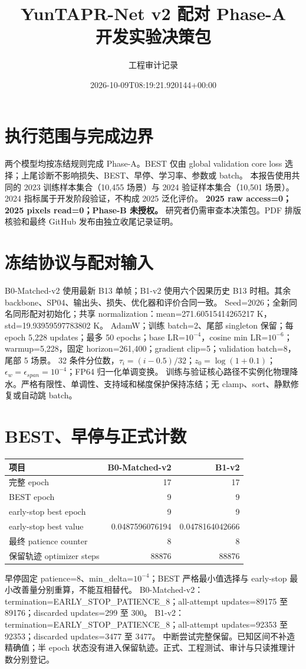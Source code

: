 \documentclass[UTF8,a4paper,11pt,fontset=windows]{ctexart}
\title{YunTAPR-Net v2 配对 Phase-A\\开发实验决策包}
\author{工程审计记录}\date{2026-10-09T08:19:21.920144+00:00}
\begin{document}
\maketitle
\section{执行范围与完成边界}
两个模型均按冻结规则完成 Phase-A。BEST 仅由 global validation core loss 选择；上尾诊断不影响损失、BEST、早停、学习率、参数或 batch。
本报告使用共同的 2023 训练样本集合（10,455 场景）与 2024 验证样本集合（10,501 场景）。2024 指标属于开发阶段验证，不构成 2025 泛化评价。
\textbf{2025 raw access=0；2025 pixels read=0；Phase-B 未授权。}
研究者仍需审查本决策包。PDF 排版核验和最终 GitHub 发布由独立收尾记录证明。
\section{冻结协议与配对输入}
B0-Matched-v2 使用最新 B13 单帧；B1-v2 使用六个因果历史 B13 时相。其余 backbone、SP04、输出头、损失、优化器和评价合同一致。
Seed=2026；全新同名同形配对初始化；共享 normalization：mean=271.60515414265217 K，std=19.93959597783802 K。
AdamW；训练 batch=2、尾部 singleton 保留；每 epoch 5,228 updates；最多 50 epochs；base LR=$10^{-4}$，cosine min LR=$10^{-6}$；warmup=5,228，固定 horizon=261,400；gradient clip=5；validation batch=8，尾部 5 场景。
32 条件分位数，$\tau_i=(i-0.5)/32$；$z_0=\log(1+0.1)$；$\epsilon_w=\epsilon_{span}=10^{-4}$；FP64 归一化单调变换。
训练与验证核心路径不实例化物理降水。严格有限性、单调性、支持域和梯度保护保持冻结；无 clamp、sort、静默修复或自动跳 batch。
\section{BEST、早停与正式计数}
\begin{tabular}{lrr}\toprule 项目 & B0-Matched-v2 & B1-v2\\\midrule
完整 epoch & 17 & 17\\
BEST epoch & 9 & 9\\
early-stop best epoch & 9 & 9\\
early-stop best value & 0.0487596076194 & 0.0478164042666\\
最终 patience counter & 8 & 8\\
保留轨迹 optimizer steps & 88876 & 88876\\
\bottomrule\end{tabular}
早停固定 patience=8、min\_delta=$10^{-4}$；BEST 严格最小值选择与 early-stop 最小改善量分别重算，不能互相替代。
B0-Matched-v2：termination=EARLY\_STOP\_PATIENCE\_8；all-attempt updates=89175 至 89176；discarded updates=299 至 300。
B1-v2：termination=EARLY\_STOP\_PATIENCE\_8；all-attempt updates=92353 至 92353；discarded updates=3477 至 3477。
中断尝试完整保留。已知区间不补造精确值；半 epoch 状态没有进入保留轨迹。正式、工程测试、审计与只读推理计数分别登记。
\end{document}
